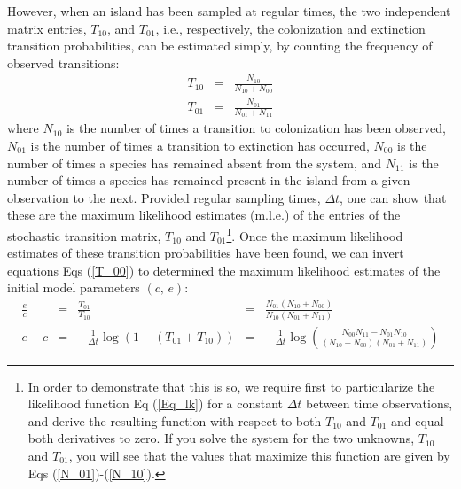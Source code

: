 \documentclass{article}
\begin{document}
However, when an island has been sampled at regular times, the two independent matrix entries, $T_{10}$, and $T_{01}$, i.e., respectively, the colonization and extinction transition probabilities, can be estimated simply, by counting the frequency of observed transitions: 
\begin{eqnarray}
\label{N_10}
T_{10} & = & \frac{N_{10}}{N_{10} + N_{00}} \\
\label{N_01}
T_{01} & = & \frac{N_{01}}{N_{01} + N_{11}}
\end{eqnarray}
where $N_{10}$ is the number of times a transition to colonization has been observed, $N_{01}$ is the number of times a transition to extinction has occurred, $N_{00}$ is the number of times a species has remained absent from the system, and $N_{11}$ is the number of times a species has remained present in the island from a given observation to the next. Provided regular sampling times, $\Delta t$,  one can show that these are the maximum likelihood estimates (m.l.e.) of the entries of the stochastic transition matrix, $T_{10}$ and $T_{01}$\footnote{In order to demonstrate that this is so, we require first to particularize the likelihood function Eq (\ref{Eq_lk}) for a constant $\Delta t$ between time observations, and derive the resulting function with respect to both $T_{10}$ and $T_{01}$ and equal both derivatives to zero. If you solve the system for the two unknowns, $T_{10}$ and $T_{01}$, you will see that the values that maximize this function are given by Eqs (\ref{N_01})-(\ref{N_10}).}. Once the maximum likelihood estimates of these transition probabilities have been found, we can invert equations Eqs (\ref{T_00}) to determined the maximum likelihood estimates of the initial model parameters $(c,\, e)$:
\begin{equation}
\begin{array}{ccccc}
\frac{e}{c} &=& \frac{T_{01}}{T_{10}}           &=&      \frac{N_{01}(N_{10}+N_{00})}{N_{10}(N_{01}+N_{11})}\\
e + c       &=& -\frac{1}{\Delta t}\log(1 - (T_{01}+T_{10})) &=& -\frac{1}{\Delta t}\log\left(\frac{N_{00}N_{11}-N_{01}N_{10}}{(N_{10}+N_{00})(N_{01}+N_{11})}\right)
\end{array}
\end{equation}

\newpage



\newpage
\setcounter{section}{0}
\renewcommand{\thesection}{P\arabic{section}}
\end{document}
